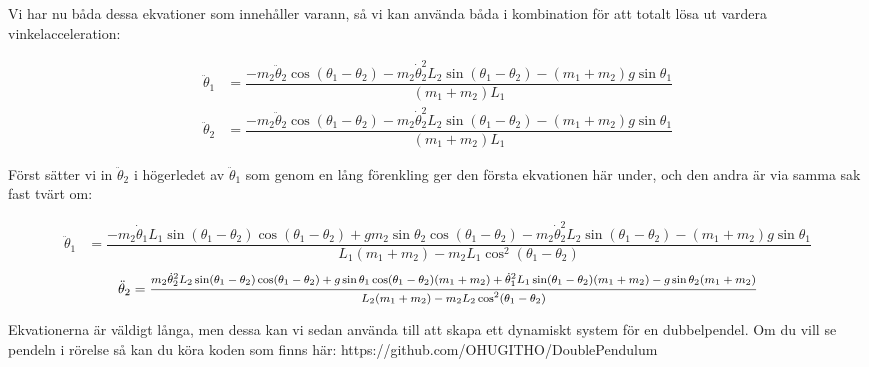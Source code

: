 \documentclass[10pt, a4paper]{amsart}
\begin{document}
Vi har nu båda dessa ekvationer som innehåller varann, så vi kan använda båda i kombination för att totalt lösa ut vardera vinkelacceleration: \bigskip 

\begin{align}
    \ddot\theta_1 &= \dfrac{-m_2\ddot\theta_2\cos(\theta_1 - \theta_2) - m_2\dot\theta_2^2L_2\sin(\theta_1 - \theta_2) - (m_1 + m_2)g\sin\theta_1}{(m_1 + m_2)L_1} \\
    \ddot\theta_2 &= \dfrac{-m_2\ddot\theta_2\cos(\theta_1 - \theta_2) - m_2\dot\theta_2^2L_2\sin(\theta_1 - \theta_2) - (m_1 + m_2)g\sin\theta_1}{(m_1 + m_2)L_1}
\end{align} \bigskip 

Först sätter vi in $ \ddot\theta_2 $ i högerledet av $ \ddot\theta_1 $ som genom en lång förenkling ger den första ekvationen här under, 
och den andra är via samma sak fast tvärt om: \bigskip 

\begin{align}
    \ddot\theta_1 &= \dfrac{-m_2\dot\theta_1L_1\sin(\theta_1 - \theta_2)\cos(\theta_1 - \theta_2) + gm_2\sin\theta_2\cos(\theta_1 - \theta_2) - m_2\dot\theta_2^2L_2\sin(\theta_1 - \theta_2) - (m_1 + m_2)g\sin\theta_1}{L_1(m_1 + m_2) - m_2L_1\cos^2(\theta_1 - \theta_2)}
\end{align}
\begin{multline}
    \ddot\theta_2 = \dfrac{\medmath{m_2\dot\theta_2^2L_2\sin(\theta_1 - \theta_2)\cos(\theta_1 - \theta_2) + g\sin\theta_1\cos(\theta_1 - \theta_2)(m_1 + m_2) + \dot\theta_1^2L_1\sin(\theta_1 - \theta_2)(m_1 + m_2) - g\sin\theta_2(m_1 + m_2)}}{\medmath{L_2(m_1 + m_2) - m_2L_2\cos^2(\theta_1 - \theta_2)}}
\end{multline} \bigskip 

Ekvationerna är väldigt långa, men dessa kan vi sedan använda till att skapa ett dynamiskt system för en dubbelpendel. 
Om du vill se pendeln i rörelse så kan du köra koden som finns här: https://github.com/OHUGITHO/DoublePendulum
\end{document}
